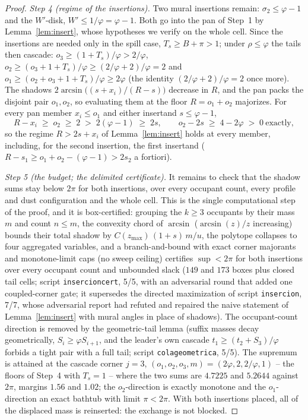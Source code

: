 \documentclass[11pt]{article}
\theoremstyle{definition}
\begin{document}
\begin{proof}
\emph{Step 4 (regime of the insertions).} Two mural insertions
remain: $\sigma_2\le\varphi-1$ and the $W'$-disk, $W'\le1/\varphi
=\varphi-1$. Both go into the pan of Step~1 by
Lemma~\ref{lem:insert}, whose hypotheses we verify on the whole
cell. Since the insertions are needed only in the spill case,
$T_s\ge B+\pi>1$; under $\rho\le\varphi$ the tails then cascade:
$o_3\ge(1+T_s)/\varphi>2/\varphi$,
$o_2\ge(o_3+1+T_s)/\varphi\ge(2/\varphi+2)/\varphi=2$ and
$o_1\ge(o_2+o_3+1+T_s)/\varphi\ge2\varphi$ (the identity
$(2/\varphi+2)/\varphi=2$ once more). The shadows
$2\arcsin\bigl((s+x_i)/(R-s)\bigr)$ decrease in $R$, and the pan
packs the disjoint pair $o_1,o_2$, so evaluating them at the floor
$R=o_1+o_2$ majorizes. For every pan member $x_i\le o_1$ and either
insertand $s\le\varphi-1$,
\[
R-x_i\;\ge\;o_2\;\ge\;2\;>\;2(\varphi-1)\;\ge\;2s ,
\qquad o_2-2s\;\ge\;4-2\varphi\;>\;0\ \text{exactly},
\]
so the regime $R>2s+x_i$ of Lemma~\ref{lem:insert} holds at every
member, including, for the second insertion, the first insertand
($R-s_1\ge o_1+o_2-(\varphi-1)>2s_2$ a fortiori).

\emph{Step 5 (the budget; the delimited certificate).} It remains
to check that the shadow sums stay below $2\pi$ for both insertions,
over every occupant count, every profile and dust configuration and
the whole cell. This is the single computational step of the proof,
and it is box-certified: grouping the $k\ge3$ occupants by their
mass $m$ and count $n\le m$, the convexity chord of $\arcsin$
($\arcsin(z)/z$ increasing) bounds their total shadow by
$C(z_{\max})\,(1{+}s)\,m/u$, the polytope collapses to four
aggregated variables, and a branch-and-bound with exact corner
majorants and monotone-limit caps (no sweep ceiling) certifies
$\sup<2\pi$ for both insertions over every occupant count and
unbounded slack ($149$ and $173$ boxes plus closed tail cells;
script \texttt{insercioncert}, 5/5, with an adversarial round that
added one coupled-corner gate; it supersedes the directed
maximization of script \texttt{insercion}, 7/7, whose adversarial
report had refuted and repaired the naive statement of
Lemma~\ref{lem:insert} with mural angles in place of shadows). The
occupant-count direction is removed by the geometric-tail lemma
(suffix masses decay geometrically, $S_i\ge\varphi S_{i+1}$, and
the leader's own cascade $t_1\ge(t_2+S_3)/\varphi$ forbids a tight
pair with a full tail; script \texttt{colageometrica}, 5/5). The
supremum is attained at the cascade corner $j=3$,
$(o_1,o_2,o_3,m)=(2\varphi,2,2/\varphi,1)$ -- the floors of Step~4
with $T_s=1$ -- where the two sums are $4.7225$ and $5.2644$
against $2\pi$, margins $1.56$ and $1.02$; the $o_2$-direction is
exactly monotone and the $o_1$-direction an exact bathtub with
limit $\pi<2\pi$. With both insertions placed, all of the displaced
mass is reinserted: the exchange is not blocked.


\end{proof}
\end{document}
